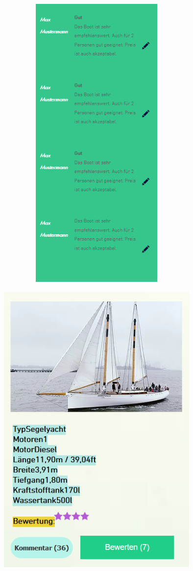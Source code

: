 \documentclass[12pt]{article}
\theoremstyle{definition}
\begin{document}
\begin{center}\includegraphics[width=10cm,height=15cm,keepaspectratio]{Bewertungen_UI2.PNG}\end{center}
\begin{center}\includegraphics[width=10cm,height=15cm,keepaspectratio]{Bewerten.PNG}\end{center}
\end{document}
